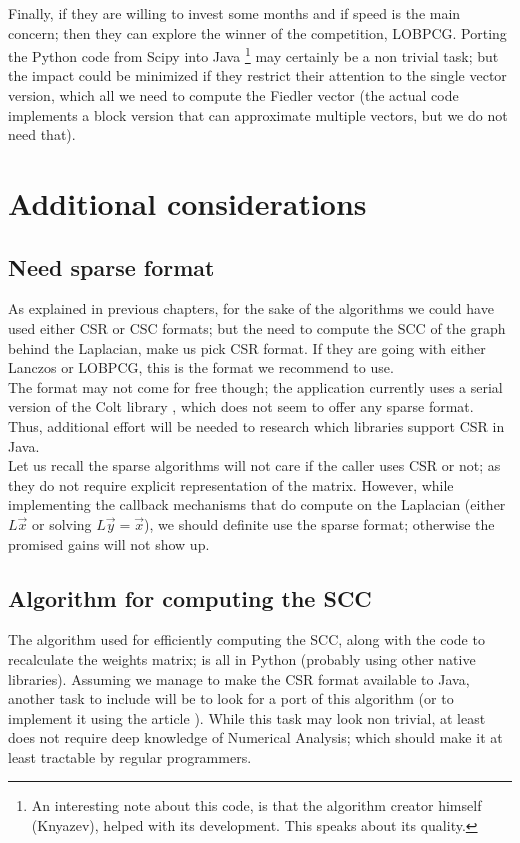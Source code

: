 Finally, if they are willing to invest some months and if speed is the
main concern; then they can explore the winner of the competition,
LOBPCG. Porting the Python code from Scipy into Java \footnote{An
  interesting note about this code, is that the algorithm creator
  himself (Knyazev), helped with its development. This speaks about
  its quality.} may certainly be a non trivial task; but the impact
could be minimized if they restrict their attention to the single
vector version, which all we need to compute the Fiedler vector (the
actual code implements a block version that can approximate multiple
vectors, but we do not need that).

\section{Additional considerations}

\subsection{Need sparse format}

As explained in previous chapters, for the sake of the algorithms we
could have used either CSR or CSC formats; but the need to compute the
SCC of the graph behind the Laplacian, make us pick CSR
format. If they are going with either Lanczos or LOBPCG, this is the
format we recommend to use. \\

The format may not come for free though; the application currently
uses a serial version of the Colt library \cite{colt}, which does not
seem to offer any sparse format. Thus, additional effort will be
needed to research which libraries support CSR in Java. \\

Let us recall the sparse algorithms will not care if the caller uses
CSR or not; as they do not require explicit representation of the
matrix. However, while implementing the callback mechanisms that do
compute on the Laplacian (either $L\vec{x}$ or solving $L\vec{y} =
\vec{x}$), we should definite use the sparse format; otherwise the
promised gains will not show up.

\subsection{Algorithm for computing the SCC}

The algorithm used for efficiently computing the SCC, along with the
code to recalculate the weights matrix; is all in Python (probably
using other native libraries). Assuming we manage to make the CSR
format available to Java, another task to include will be to look for
a port of this algorithm (or to implement it using the article
\cite{pearce05}). While this task may look non trivial, at least does
not require deep knowledge of Numerical Analysis; which should make it
at least tractable by regular programmers.

